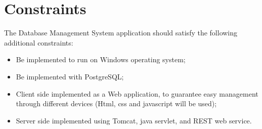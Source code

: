 \section{Constraints}

The Database Management System application should satisfy the following additional constraints:
\begin{itemize}
    \item Be implemented to run on Windows operating system;
    \item Be implemented with PostgreSQL;
    \item Client side implemented as a Web application, to guarantee easy management through different devices (Html, css and javascript will be used);
    \item Server side implemented using Tomcat, java servlet, and REST web service.
\end{itemize}